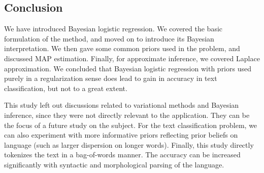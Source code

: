 \documentclass[a0,portrait]{a0poster}
\begin{document}
\begin{multicols}{2}
\section{Conclusion}

We have introduced Bayesian logistic regression. We covered the basic formulation of the method, and moved on to introduce its Bayesian interpretation. We then gave some common priors used in the problem, and discussed MAP estimation. Finally, for approximate inference, we covered Laplace approximation. We concluded that Bayesian logistic regression with priors used purely in a regularization sense does lead to gain in accuracy in text classification, but not to a great extent.

This study left out discussions related to variational methods and Bayesian inference, since they were not directly relevant to the application. They can be the focus of a future study on the subject. For the text classification problem, we can also experiment with more informative priors reflecting prior beliefs on language (such as larger dispersion on longer words). Finally, this study directly tokenizes the text in a bag-of-words manner. The accuracy can be increased significantly with syntactic and morphological parsing of the language.





\end{multicols}
\end{document}
